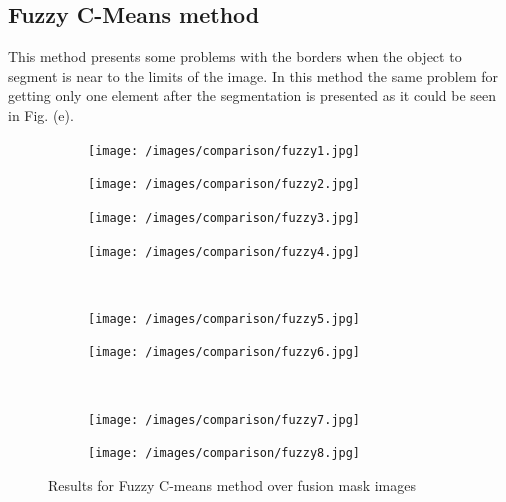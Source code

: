 \documentclass[a4paper, 10pt, conference]{ieeeconf}        %
\begin{document}
\subsection{Fuzzy C-Means method}
This method presents some problems with the borders when the object to segment is near to the limits of the image. In this method the same problem for getting only one element after the segmentation is presented as it could be seen in Fig. (e). 
\begin{figure}[ht!]
  \centering
  \begin{subfigure}{0.45\linewidth}
  \texttt{[image: /images/comparison/fuzzy1.jpg]}
  \caption{}
  \end{subfigure}
   \begin{subfigure}{0.45\linewidth}
   \texttt{[image: /images/comparison/fuzzy2.jpg]}
   \caption{}
   \end{subfigure}
     \begin{subfigure}{0.45\linewidth}
     \texttt{[image: /images/comparison/fuzzy3.jpg]}
     \caption{}
     \end{subfigure}
       \begin{subfigure}{0.45\linewidth}
       \texttt{[image: /images/comparison/fuzzy4.jpg]}
       \caption{}
       \end{subfigure}\\
        \begin{subfigure}{0.45\linewidth}
        \texttt{[image: /images/comparison/fuzzy5.jpg]}
        \caption{}
        \end{subfigure}
          \begin{subfigure}{0.45\linewidth}
          \texttt{[image: /images/comparison/fuzzy6.jpg]}
          \caption{}
          \end{subfigure}\\
            \begin{subfigure}{0.45\linewidth}
            \texttt{[image: /images/comparison/fuzzy7.jpg]}
            \caption{}
            \end{subfigure}
             \begin{subfigure}{0.45\linewidth}
             \texttt{[image: /images/comparison/fuzzy8.jpg]}
             \caption{}
             \end{subfigure}
  \caption{Results for Fuzzy C-means method over fusion mask images}
  \label{fuzzyResults}
  \end{figure}
\vfill
\newpage
\end{document}
